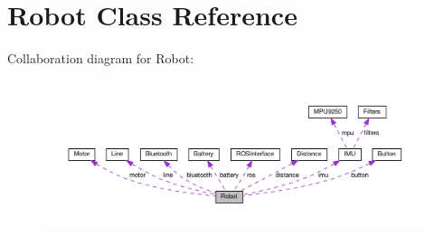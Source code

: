 \hypertarget{class_robot}{}\section{Robot Class Reference}
\label{class_robot}


Collaboration diagram for Robot\+:
\nopagebreak
\begin{figure}[H]
\begin{center}
\leavevmode
\includegraphics[width=350pt]{class_robot__coll__graph}
\end{center}
\end{figure}
